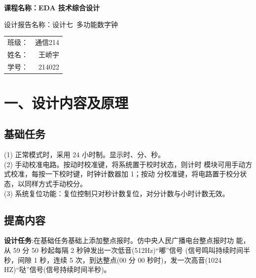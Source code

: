 \documentclass{article}
\newcommand{\fourhao}{\fontsize{14pt}{\baselineskip}\selectfont} %
\newcommand{\xiaosihao}{\fontsize{12pt}{\baselineskip}\selectfont} %
\begin{document}
\begin{titlepage}
    \centering
    \vspace*{2cm}

    \Huge
    \textbf{课程名称：EDA 技术综合设计}

    \vspace{2cm}

    \LARGE
    设计报告名称：设计七\ 多功能数字钟

    \vspace{4cm}

    \centering
    \Large
    \begin{tabular}{rl}
        班级： & 通信214    \\
        姓名： & \ 王峤宇    \\
        学号： & \ 214022
    \end{tabular}

    \vfill

    \vspace{1cm}
\end{titlepage}

\newpage
\section*{\fourhao 一、设计内容及原理}
\xiaosihao
{}
\subsection*{基础任务}
(1) 正常模式时，采用 24 小时制。显示时、分、秒。 \\
(2) 手动校准电路。按动时校准键，将系统置于校时状态，则计时 模块可用手动方式校准，每按一下校时键，时钟计数器加 1；按动 分校准键，将电路置于校分状态，以同样方式手动校分。\\
(3) 系统复位功能：复位控制只对秒计数复位，对分计数与小时计数无效。
\subsection*{提高内容}
\textbf{设计任务}:在基础任务基础上添加整点报时。仿中央人民广播电台整点报时功 能，从 59 分 50 秒起每隔 2 秒钟发出一次低音(512Hz)“嘟”信号 (信号鸣叫持续时间半秒，间隙 1 秒，连续 5 次，到达整点(00 分 00
秒时)，发一次高音(1024 HZ)“哒”信号(信号持续时间半秒)。
\end{document}
